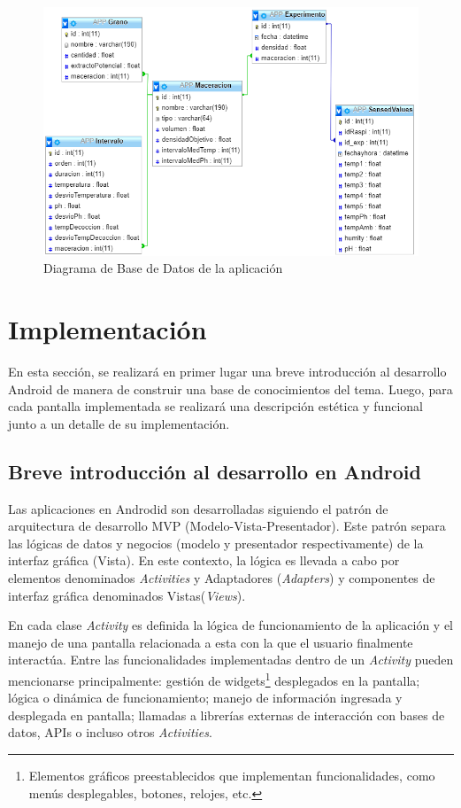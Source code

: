         \begin{figure}[h]
            \centering
            \includegraphics[scale=0.8]{DiagramaBaseDeDatosAPP.jpg}
            \caption{Diagrama de Base de Datos de la aplicación}
            \label{fig:DiagramaBdApp}
        \end{figure}

\section{Implementación}
    \par En esta sección, se realizará en primer lugar una breve introducción al desarrollo Android de manera de construir una base de conocimientos del tema. Luego, para cada pantalla implementada se realizará una descripción estética y funcional junto a un detalle de su implementación.
    
    \subsection{Breve introducción al desarrollo en Android}
    
    \par Las aplicaciones en Androdid son desarrolladas siguiendo el patrón de arquitectura de desarrollo MVP (Modelo-Vista-Presentador). Este patrón separa las lógicas de datos y negocios (modelo y presentador respectivamente) de la interfaz gráfica (Vista). En este contexto, la lógica es llevada a cabo por elementos denominados \textit{Activities} y Adaptadores (\textit{Adapters}) y componentes de interfaz gráfica denominados Vistas(\textit{Views}).
    
    \par En cada clase \textit{Activity} es definida la lógica de funcionamiento de la aplicación y el manejo de una pantalla relacionada a esta con la que el usuario finalmente interactúa. Entre las funcionalidades implementadas dentro de un \textit{Activity} pueden mencionarse principalmente: gestión de widgets\footnote{Elementos gráficos preestablecidos que implementan funcionalidades, como menús desplegables, botones, relojes, etc.} desplegados en la pantalla; lógica o dinámica de funcionamiento; manejo de información ingresada y desplegada en pantalla; llamadas a librerías externas de interacción con bases de datos, APIs o incluso otros \textit{Activities}.
    
